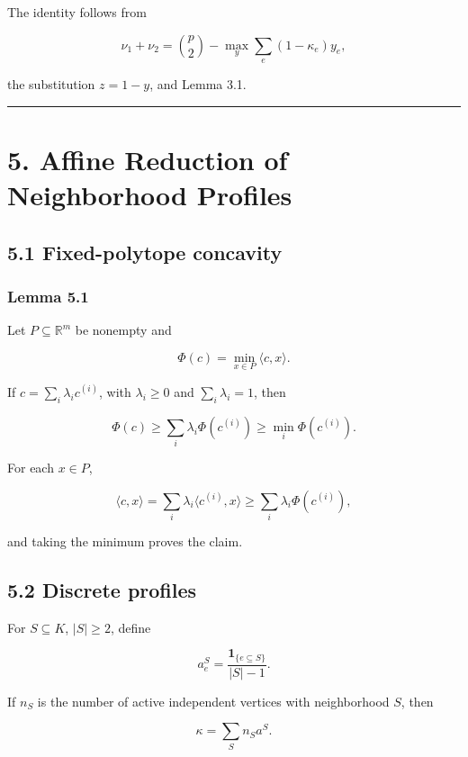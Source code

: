 \documentclass[11pt,a4paper]{article}
\begin{document}
The identity follows from

\[
\nu_1+\nu_2
=
\binom p2-
\max_y\sum_e(1-\kappa_e)y_e,
\]

the substitution \(z=1-y\), and Lemma 3.1.

\begin{center}\rule{0.5\linewidth}{0.5pt}\end{center}

\section{5. Affine Reduction of Neighborhood Profiles}\label{affine-reduction-of-neighborhood-profiles}

\subsection{5.1 Fixed-polytope concavity}\label{fixed-polytope-concavity}

\subsubsection{Lemma 5.1}\label{lemma-5.1}

Let \(P\subseteq\mathbb R^m\) be nonempty and

\[
\Phi(c)=\min_{x\in P}\langle c,x\rangle.
\]

If \(c=\sum_i\lambda_ic^{(i)}\), with \(\lambda_i\ge0\) and \(\sum_i\lambda_i=1\), then

\[
\boxed{
\Phi(c)\ge\sum_i\lambda_i\Phi(c^{(i)})
\ge\min_i\Phi(c^{(i)}).
}
\tag{5.1}
\]

For each \(x\in P\),

\[
\langle c,x\rangle
=
\sum_i\lambda_i\langle c^{(i)},x\rangle
\ge
\sum_i\lambda_i\Phi(c^{(i)}),
\]

and taking the minimum proves the claim.

\subsection{5.2 Discrete profiles}\label{discrete-profiles}

For \(S\subseteq K\), \(|S|\ge2\), define

\[
a^S_e=\frac{\mathbf1_{\{e\subseteq S\}}}{|S|-1}.
\]

If \(n_S\) is the number of active independent vertices with neighborhood \(S\), then

\[
\kappa=\sum_Sn_Sa^S.
\]
\end{document}
